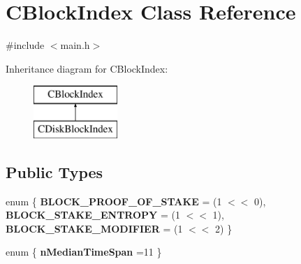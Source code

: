 \hypertarget{class_c_block_index}{}\section{C\+Block\+Index Class Reference}
\label{class_c_block_index}


{\ttfamily \#include $<$main.\+h$>$}

Inheritance diagram for C\+Block\+Index\+:\begin{figure}[H]
\begin{center}
\leavevmode
\includegraphics[height=2.000000cm]{class_c_block_index}
\end{center}
\end{figure}
\subsection*{Public Types}
\begin{DoxyCompactItemize}
\item 
\mbox{\label{class_c_block_index_acefc16035e60d7bd52ed2c9bb1aa838e}} 
enum \{ {\bfseries B\+L\+O\+C\+K\+\_\+\+P\+R\+O\+O\+F\+\_\+\+O\+F\+\_\+\+S\+T\+A\+KE} = (1 $<$$<$ 0), 
{\bfseries B\+L\+O\+C\+K\+\_\+\+S\+T\+A\+K\+E\+\_\+\+E\+N\+T\+R\+O\+PY} = (1 $<$$<$ 1), 
{\bfseries B\+L\+O\+C\+K\+\_\+\+S\+T\+A\+K\+E\+\_\+\+M\+O\+D\+I\+F\+I\+ER} = (1 $<$$<$ 2)
 \}
\item 
\mbox{\label{class_c_block_index_ab653dac2338ab38050906e8a3096d428}} 
enum \{ {\bfseries n\+Median\+Time\+Span} =11
 \}
\end{DoxyCompactItemize}
